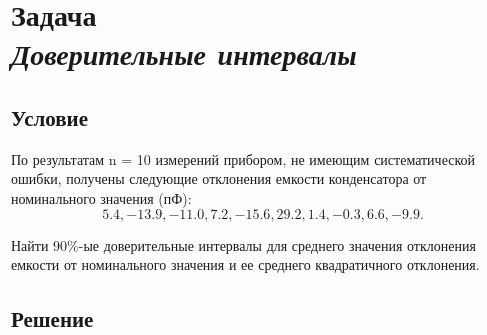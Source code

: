 \section*{Задача \\\textit{Доверительные интервалы}}

\subsection*{Условие}
\sloppy По результатам n = 10 измерений прибором, не имеющим систематической ошибки, получены следующие отклонения емкости конденсатора от номинального значения (пФ):
\begin{equation*}
    5.4, -13.9, -11.0, 7.2, -15.6, 29.2, 1.4, -0.3, 6.6, -9.9.
\end{equation*}

Найти 90\%-ые доверительные интервалы для среднего значения отклонения емкости от номинального значения и ее среднего квадратичного отклонения.

\subsection*{Решение}





